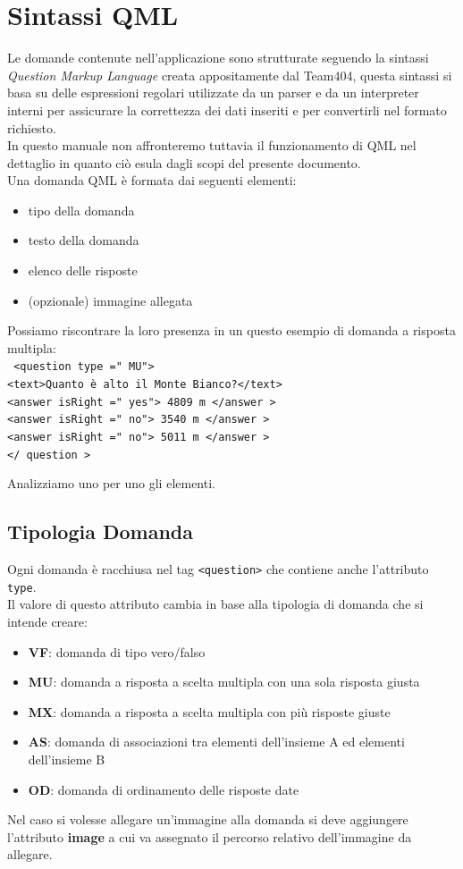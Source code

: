 \documentclass[a4paper,11pt]{article}
\newcommand{\code}[1]{\texttt{#1}}
\begin{document}
	\section{Sintassi QML}
	Le domande contenute nell'applicazione sono strutturate seguendo la sintassi \textit{Question Markup Language} creata appositamente dal Team404, questa sintassi si basa su delle espressioni regolari utilizzate da un parser e da un interpreter interni per assicurare la correttezza dei dati inseriti e per convertirli nel formato richiesto. \\ In questo manuale non affronteremo tuttavia il funzionamento di QML nel dettaglio in quanto ciò esula dagli scopi del presente documento.\\	
Una domanda QML è formata dai seguenti elementi:
\begin{itemize}
\item tipo della domanda
\item testo della domanda
\item elenco delle risposte
\item (opzionale) immagine allegata
\end{itemize}
Possiamo riscontrare la loro presenza in un questo esempio di domanda a risposta multipla:\\
\code{
<question type =" MU">\\
	<text>Quanto è alto il Monte Bianco?</text>\\
	<answer isRight =" yes"> 4809 m </answer >\\
	<answer isRight =" no"> 3540 m </answer >\\
	<answer isRight =" no"> 5011 m </answer >\\
</ question >\\}


Analizziamo uno per uno gli elementi.
\subsection{Tipologia Domanda}
Ogni domanda è racchiusa nel tag \code{<question>} che contiene anche l'attributo \code{type}.\\
Il valore di questo attributo cambia in base alla tipologia di domanda che si intende creare:
\begin{itemize}
\item \textbf{VF}: domanda di tipo vero/falso
\item \textbf{MU}: domanda a risposta a scelta multipla con una sola risposta giusta
\item \textbf{MX}: domanda a risposta a scelta multipla con più risposte giuste
\item \textbf{AS}: domanda di associazioni tra elementi dell'insieme A ed elementi dell'insieme B
\item \textbf{OD}: domanda di ordinamento delle risposte date
\end{itemize}
Nel caso si volesse allegare un'immagine alla domanda si deve aggiungere l'attributo \textbf{image} a cui va assegnato il percorso relativo dell'immagine da allegare.\\
\newpage
\end{document}
